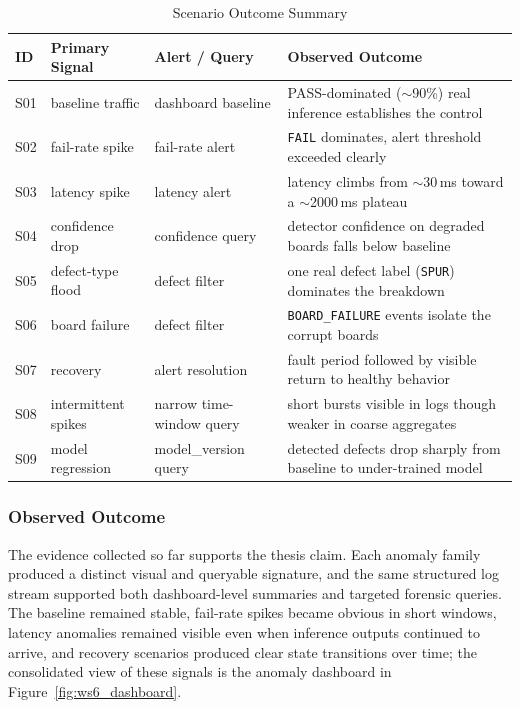 \documentclass[12pt,a4paper]{article}
\begin{document}
\begin{table}[!ht]
\centering
\caption{Scenario Outcome Summary}
\label{tab:scenario_results_template}
\begin{tabular}{p{} p{} p{} p{}}
\toprule
\textbf{ID} & \textbf{Primary Signal} & \textbf{Alert / Query} & \textbf{Observed Outcome} \\
\midrule
S01 & baseline traffic & dashboard baseline & PASS-dominated ($\sim$90\%) real inference establishes the control \\
S02 & fail-rate spike & fail-rate alert & \texttt{FAIL} dominates, alert threshold exceeded clearly \\
S03 & latency spike & latency alert & latency climbs from $\sim$30\,ms toward a $\sim$2000\,ms plateau \\
S04 & confidence drop & confidence query & detector confidence on degraded boards falls below baseline \\
S05 & defect-type flood & defect filter & one real defect label (\texttt{SPUR}) dominates the breakdown \\
S06 & board failure & defect filter & \texttt{BOARD\_FAILURE} events isolate the corrupt boards \\
S07 & recovery & alert resolution & fault period followed by visible return to healthy behavior \\
S08 & intermittent spikes & narrow time-window query & short bursts visible in logs though weaker in coarse aggregates \\
S09 & model regression & model\_version query & detected defects drop sharply from baseline to under-trained model \\
\bottomrule
\end{tabular}
\end{table}

\subsubsection{Observed Outcome}
The evidence collected so far supports the thesis claim. Each anomaly family
produced a distinct visual and queryable signature, and the same structured log
stream supported both dashboard-level summaries and targeted forensic queries.
The baseline remained stable, fail-rate spikes became obvious in short windows,
latency anomalies remained visible even when inference outputs continued to
arrive, and recovery scenarios produced clear state transitions over time; the
consolidated view of these signals is the anomaly dashboard in
Figure~\ref{fig:ws6_dashboard}.
\end{document}
